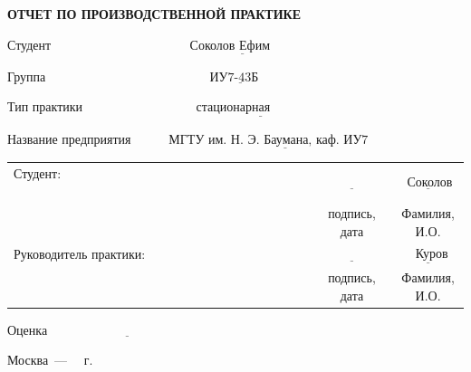 \begin{titlepage}
	
	\begin{center}
		\noindent\begin{minipage}{1.2\textwidth}\centering
			\textbf{ ОТЧЕТ ПО ПРОИЗВОДСТВЕННОЙ ПРАКТИКЕ }\newline\newline\newline
		\end{minipage}
	\end{center}

	\noindent Студент $\underline{\text{~~~~~~~~~~~~~~~~~~~~~~~~~~~~~~~~Соколов Ефим~~~~~~~~~~~~~~~~~~~~~~~~~~~~~~~~~~~~~~}}$
	
	\noindent Группа $\underline{\text{~~~~~~~~~~~~~~~~~~~~~~~~~~~~~~~~~~~~~~ИУ7-43Б~~~~~~~~~~~~~~~~~~~~~~~~~~~~~~~~~~~~~~~~~}}$
	
	\noindent Тип практики $\underline{\text{~~~~~~~~~~~~~~~~~~~~~~~~~~стационарная~~~~~~~~~~~~~~~~~~~~~~~~~~~~~~~~~~~~~~~}}$
	
	\noindent Название предприятия $\underline{\text{~~~~~~~~МГТУ им. Н. Э. Баумана, каф. ИУ7~~~~~~~~~~~~~~~~}}$\newline
	
	
	\noindent\begin{tabular}{lcc}
		Студент: ~~~~~~~~~~~~~~~~~~~~~~~~~~~~~~~~~~~~~~~~~~~~~& $\underline{\text{~~~~~~~~~~~~~~~~}}$ & $\underline{\text{~~Соколов Е. М.~~}}$ \\
		& \footnotesize подпись, дата  & \footnotesize Фамилия, И.О. \\
		Руководитель практики: & $\underline{\text{~~~~~~~~~~~~~~~~}}$ & $\underline{\text{~~~~Куров А. В.~~~}}$ \\
		& \footnotesize подпись, дата & \footnotesize Фамилия, И.О. \\
	\end{tabular}
	
	\noindent Оценка $\underline{\text{~~~~~~~~~~~~~~~~~~~~~~~~~~~~~~~~~~~~}}$
	
	
	\begin{center}
		\vfill
		Москва~---~\the\year
		~г.
	\end{center}
 \restoregeometry
\end{titlepage}
